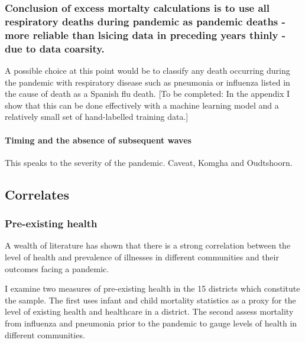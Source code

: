 \documentclass[fleqn,10pt,lineno]{wlpeerj} %
\begin{document}
\hypertarget{conclusion-of-excess-mortalty-calculations-is-to-use-all-respiratory-deaths-during-pandemic-as-pandemic-deaths---more-reliable-than-lsicing-data-in-preceding-years-thinly---due-to-data-coarsity.}{%
\subsubsection{Conclusion of excess mortalty calculations is to use all respiratory deaths during pandemic as pandemic deaths - more reliable than lsicing data in preceding years thinly - due to data coarsity.}\label{conclusion-of-excess-mortalty-calculations-is-to-use-all-respiratory-deaths-during-pandemic-as-pandemic-deaths---more-reliable-than-lsicing-data-in-preceding-years-thinly---due-to-data-coarsity.}}

A possible choice at this point would be to classify any death occurring during the pandemic with respiratory disease such as pneumonia or influenza listed in the cause of death as a Spanish flu death. {[}To be completed: In the appendix I show that this can be done effectively with a machine learning model and a relatively small set of hand-labelled training data.{]}

\hypertarget{timing-and-the-absence-of-subsequent-waves}{%
\paragraph{Timing and the absence of subsequent waves}\label{timing-and-the-absence-of-subsequent-waves}}

This speaks to the severity of the pandemic. Caveat, Komgha and Oudtshoorn.

\hypertarget{correlates}{%
\subsection{Correlates}\label{correlates}}

\hypertarget{pre-existing-health}{%
\subsubsection{Pre-existing health}\label{pre-existing-health}}

A wealth of literature has shown that there is a strong correlation between the level of health and prevalence of illnesses in different communities and their outcomes facing a pandemic.

I examine two measures of pre-existing health in the 15 districts which constitute the sample. The first uses infant and child mortality statistics as a proxy for the level of existing health and healthcare in a district. The second assess mortality from influenza and pneumonia prior to the pandemic to gauge levels of health in different communities.
\end{document}
